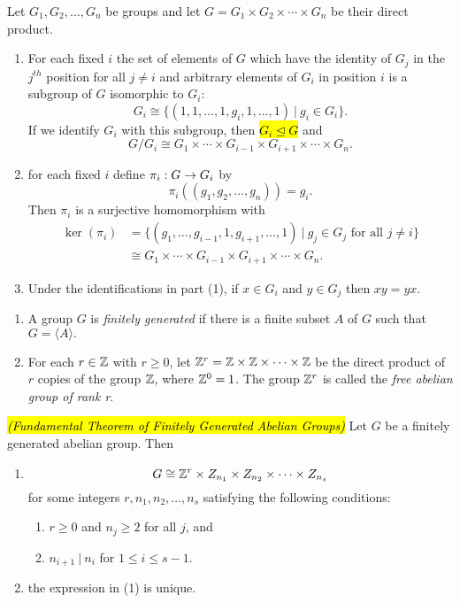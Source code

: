 \begin{prop}
Let $G_1, G_2, \ldots, G_n$ be groups and let $G = G_1\times G_2\times \cdots\times G_n$ be their direct product.
\begin{enumerate}
\item For each fixed $i$ the set of elements of $G$ which have the identity of $G_j$ in the $j^{th}$ position for all $j\neq i$ and arbitrary elements of $G_i$ in position $i$ is a subgroup of $G$ isomorphic to $G_i$:
\[G_i \cong \{(1,1,\ldots,1,g_i,1,\ldots,1)\ |\ g_i\in G_i\}.\]
If we identify $G_i$ with this subgroup, then \hl{$G_i \unlhd G$} and 
\[G/G_i\cong G_1\times\cdots\times G_{i-1}\times G_{i+1}\times \cdots\times G_n.\]
\item for each fixed $i$ define $\pi_i:G\rightarrow G_i$ by
\[\pi_i((g_1,g_2,\ldots,g_n)) = g_i.\]
Then $\pi_i$ is a surjective homomorphism with
\begin{align*}
\ker(\pi_i) &= \{(g_1,\ldots,g_{i-1},1,g_{i+1},\ldots,1)\ |\ g_j\in G_j\text{ for all } j\neq i\}\\
&\cong G_1\times\cdots\times G_{i-1}\times G_{i+1}\times \cdots\times G_n.
\end{align*}
\item Under the identifications in part (1), if $x\in G_i$ and $y\in G_j$ then $xy = yx$.
\end{enumerate}
\end{prop}

\nl

\begin{defn}\nl
\begin{enumerate}
\item A group $G$ is \textit{finitely generated} if there is a finite subset $A$ of $G$ such that $G = \langle A\rangle.$
\item For each $r\in \mathbb{Z}$ with $r\geq 0$, let $\mathbb{Z}^r = \mathbb{Z}\times\mathbb{Z}\times\cdots\times\mathbb{Z}$ be the direct product of $r$ copies of the group $\mathbb{Z}$, where $\mathbb{Z}^0 = 1$. The group $\mathbb{Z}^r$ is called the \textit{free abelian group of rank r}.
\end{enumerate}
\end{defn}

\nl

\begin{thm}\hl{\textit{(Fundamental Theorem of Finitely Generated Abelian Groups)}}
Let $G$ be a finitely generated abelian group. Then
\begin{enumerate}
\item 
\[G\cong \mathbb{Z}^r\times Z_{n_1}\times Z_{n_2}\times\cdots\times Z_{n_s}\]
for some integers $r,n_1,n_2,\ldots,n_s$ satisfying the following conditions:
\begin{enumerate}
\item $r\geq 0$ and $n_j \geq 2$ for all $j$, and
\item $n_{i+1}\ |\ n_i$ for $1\leq i\leq s-1$.
\end{enumerate}
\item the expression in (1) is unique.
\end{enumerate}
\end{thm}

